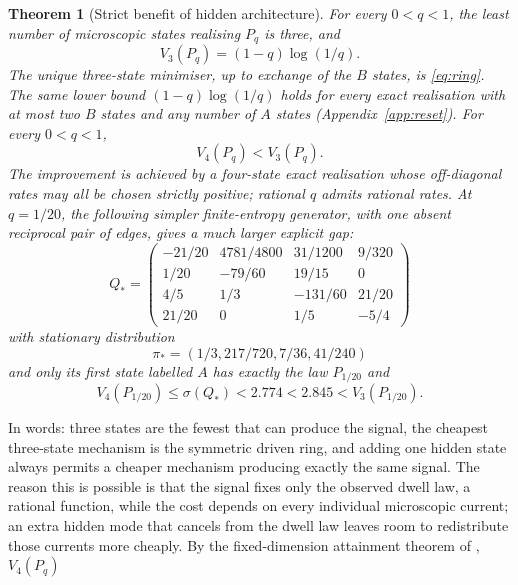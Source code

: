 \documentclass[11pt,a4paper]{article}
\newtheorem{theorem}{Theorem}
\theoremstyle{remark}\newtheorem{remark}[theorem]{Remark}
\begin{document}
\begin{theorem}[Strict benefit of hidden architecture]\label{thm:main}
For every $0<q<1$, the least number of microscopic states realising $P_q$ is
three, and
\begin{equation}\label{eq:threeopt}
 V_3(P_q)=(1-q)\log(1/q).
\end{equation}
The unique three-state minimiser, up to exchange of the $B$ states, is
\eqref{eq:ring}. The same lower bound $(1-q)\log(1/q)$ holds for every
exact realisation with at most two $B$ states and any number of $A$ states
(Appendix~\ref{app:reset}). For every $0<q<1$,
\begin{equation}\label{eq:allqstrict}
 V_4(P_q)<V_3(P_q).
\end{equation}
The improvement is achieved by a four-state exact realisation whose
off-diagonal rates may all be chosen strictly positive; rational $q$ admits
rational rates. At $q=1/20$, the following simpler finite-entropy generator,
with one absent reciprocal pair of edges, gives a much larger explicit gap:
\begin{equation}\label{eq:fourq}
 Q_*=
 \begin{pmatrix}
 -21/20&4781/4800&31/1200&9/320\\
 1/20&-79/60&19/15&0\\
 4/5&1/3&-131/60&21/20\\
 21/20&0&1/5&-5/4
 \end{pmatrix}
\end{equation}
with stationary distribution
\begin{equation}\label{eq:fourpi}
 \pi_*=(1/3,217/720,7/36,41/240)
\end{equation}
and only its first state labelled $A$ has exactly the law $P_{1/20}$ and
\begin{equation}\label{eq:strictgap}
 V_4(P_{1/20})\leq \sigma(Q_*)<2.774<2.845<V_3(P_{1/20}).
\end{equation}
\end{theorem}

In words: three states are the fewest that can produce the signal, the
cheapest three-state mechanism is the symmetric driven ring, and adding one
hidden state always permits a cheaper mechanism producing exactly the same
signal. The reason this is possible is that the signal fixes only the observed
dwell law, a rational function, while the cost depends on every individual
microscopic current; an extra hidden mode that cancels from the dwell law
leaves room to redistribute those currents more cheaply.
By the fixed-dimension attainment theorem of \cite{aznagulov}, $V_4(P_q)$
\end{document}
